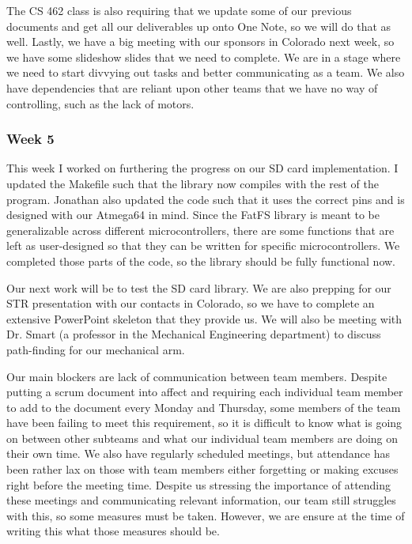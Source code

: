 The CS 462 class is also requiring that we update some of our previous documents and get all our deliverables up onto
One Note, so we will do that as well. Lastly, we have a big meeting with our sponsors in Colorado next week, so we
have some slideshow slides that we need to complete. We are in a stage where we need to start divvying out tasks
and better communicating as a team. We also have dependencies that are reliant upon other teams that we have no way 
of controlling, such as the lack of motors.

\subsubsection{Week 5}
This week I worked on furthering the progress on our SD card implementation. I updated the Makefile such that the 
library now compiles with the rest of the program. Jonathan also updated the code such that it uses the correct pins
and is designed with our Atmega64 in mind. Since the FatFS library is meant to be generalizable across different
microcontrollers, there are some functions that are left as user-designed so that they can be written for specific
microcontrollers. We completed those parts of the code, so the library should be fully functional now.

Our next work will be to test the SD card library. We are also prepping for our STR presentation with our contacts
in Colorado, so we have to complete an extensive PowerPoint skeleton that they provide us. We will also be meeting with
Dr. Smart (a professor in the Mechanical Engineering department) to discuss path-finding for our mechanical arm.

Our main blockers are lack of communication between team members. Despite putting a scrum document into affect and 
requiring each individual team member to add to the document every Monday and Thursday, some members of the team
have been failing to meet this requirement, so it is difficult to know what is going on between other subteams
and what our individual team members are doing on their own time. We also have regularly scheduled meetings, but
attendance has been rather lax on those with team members either forgetting or making excuses right before the meeting
time. Despite us stressing the importance of attending these meetings and communicating relevant information, our team
still struggles with this, so some measures must be taken. However, we are ensure at the time of writing this what
those measures should be. 

